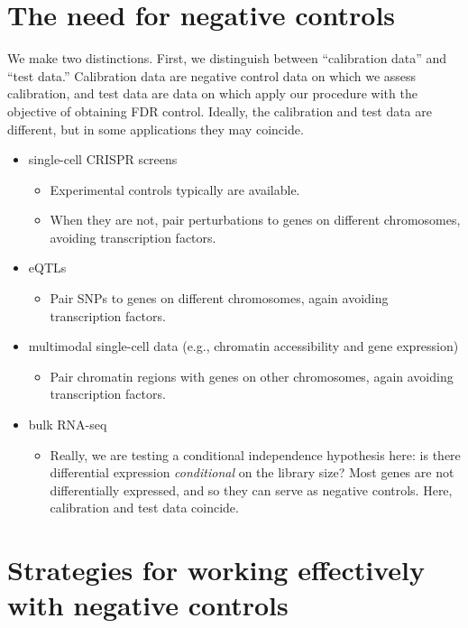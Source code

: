 \documentclass[12pt]{article}
\begin{document}
\section{The need for negative controls} 

We make two distinctions. First, we distinguish between ``calibration data'' and ``test data.'' Calibration data are negative control data on which we assess calibration, and test data are data on which apply our procedure with the objective of obtaining FDR control. Ideally, the calibration and test data are different, but in some applications they may coincide. 

\begin{itemize}
	\item single-cell CRISPR screens
	\begin{itemize}
	\item Experimental controls typically are available.
	\item When they are not, pair perturbations to genes on different chromosomes, avoiding transcription factors.
	\end{itemize}
	\item eQTLs
	\begin{itemize}
	\item Pair SNPs to genes on different chromosomes, again avoiding transcription factors.
	\end{itemize}
	\item multimodal single-cell data (e.g., chromatin accessibility and gene expression)
	\begin{itemize}
	\item Pair chromatin regions with genes on other chromosomes, again avoiding transcription factors.
	\end{itemize}
	\item bulk RNA-seq
	\begin{itemize}
	\item Really, we are testing a conditional independence hypothesis here: is there differential expression \textit{conditional} on the library size? Most genes are not differentially expressed, and so they can serve as negative controls. Here, calibration and test data coincide.
	\end{itemize}
\end{itemize}

\section{Strategies for working effectively with negative controls}
\end{document}
